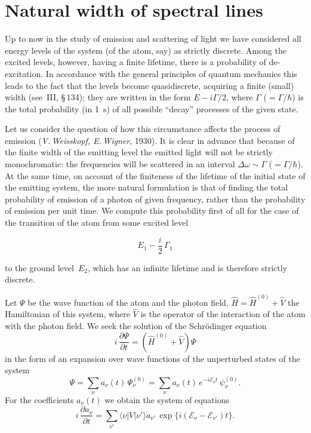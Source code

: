 \section{Natural width of spectral lines}

Up to now in the study of emission and scattering of light we have considered all energy levels of the system (of the atom, say) as strictly discrete. Among the excited levels, however, having a finite lifetime, there is a probability of de-excitation. In accordance with the general principles of quantum mechanics this leads to the fact that the levels become quasidiscrete, acquiring a finite (small) width (see~III, \S\,134); they are written in the form $E - i\Gamma/2$, where $\Gamma$ ($= \Gamma/\hbar$) is the total probability (in 1~s) of all possible ``decay'' processes of the given state.

Let us consider the question of how this circumstance affects the process of emission (\textit{V.\,Weisskopf, E.\,Wigner}, 1930). It is clear in advance that because of the finite width of the emitting level the emitted light will not be strictly monochromatic: the frequencies will be scattered in an interval $\Delta\omega \sim \Gamma$ ($= \Gamma/\hbar$). At the same time, on account of the finiteness of the lifetime of the initial state of the emitting system, the more natural formulation is that of finding the total probability of emission of a photon of given frequency, rather than the probability of emission per unit time. We compute this probability first of all for the case of the transition of the atom from some excited level

\[
E_1 - \frac{i}{2}\,\Gamma_1
\]

to the ground level~$E_2$, which has an infinite lifetime and is therefore strictly discrete.

Let $\Psi$ be the wave function of the atom and the photon field, $\hat{H} = \hat{H}^{(0)} + \hat{V}$ the Hamiltonian of this system, where $\hat{V}$ is the operator of the interaction of the atom with the photon field. We seek the solution of the Schr\"odinger equation
\begin{equation}
i\,\frac{\partial\Psi}{\partial t} = (\hat{H}^{(0)} + \hat{V})\Psi
\tag{62.1}
\end{equation}
in the form of an expansion over wave functions of the unperturbed states of the system
\begin{equation}
\Psi = \sum_\nu a_\nu(t)\,\Psi^{(0)}_\nu = \sum_\nu a_\nu(t)\,e^{-i\mathcal{E}_\nu t}\,\psi^{(0)}_\nu.
\tag{62.2}
\end{equation}
For the coefficients $a_\nu(t)$ we obtain the system of equations
\begin{equation}
i\,\frac{\partial a_\nu}{\partial t} = \sum_{\nu'}\langle\nu|V|\nu'\rangle a_{\nu'}\,\exp\{i(\mathcal{E}_\nu - \mathcal{E}_{\nu'})t\}.
\tag{62.3}
\end{equation}

